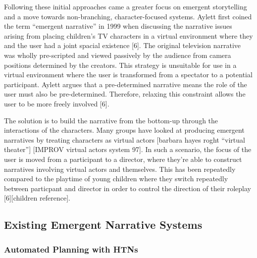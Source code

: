 \documentclass{sig-alternate-05-2015}
\begin{document}
\noindent Following these initial approaches came a greater focus on emergent storytelling and a move towards non-branching, character-focused systems. Aylett first coined the term ``emergent narrative'' in 1999 when discussing the narrative issues arising from placing children's TV characters in a virtual environment where they and the user had a joint spacial existence [6]. The original television narrative was wholly pre-scripted and viewed passively by the audience from camera positions determined by the creators. This strategy is unsuitable for use in a virtual environment where the user is transformed from a spectator to a potential participant. Aylett argues that a pre-determined narrative means the role of the user must also be pre-determined. Therefore, relaxing this constraint allows the user to be more freely involved [6].

The solution is to build the narrative from the bottom-up through the interactions of the characters. Many groups have looked at producing emergent narratives by treating characters as virtual actors [barbara hayes roght ``virtual theater''] [IMPROV virtual actors system 97]. In such a scenario, the focus of the user is moved from a participant to a director, where they're able to construct narratives involving virtual actors and themselves. This has been repeatedly compared to the playtime of young children where they switch repeatedly between particpant and director in order to control the direction of their roleplay [6][children reference]. 

\subsection{Existing Emergent Narrative Systems}

\subsubsection{Automated Planning with HTNs}
\end{document}
